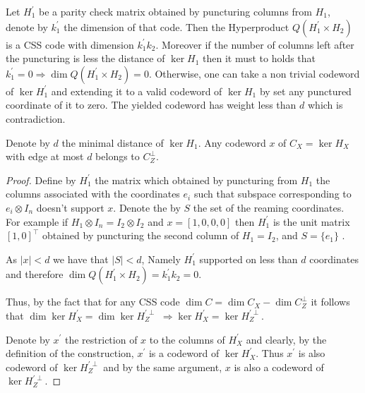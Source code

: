 \begin{remark}
  \label{remark:pun}
  Let $H_{1}^{\prime}$ be a parity check matrix obtained by puncturing columns from $H_{1}$, denote by $k^{\prime}_{1}$ the dimension of that code. Then the Hyperproduct $Q(H_{1}^{\prime}\times H_{2})$ is a CSS code with dimension $k^{\prime}_{1}k_{2}$. Moreover if the number of columns left after the puncturing is less the distance of $\ker H_{1}$ then it must to holds that $k^{\prime}_{1} = 0 \Rightarrow \dim Q(H_{1}^{\prime} \times H_{2}) = 0$. Otherwise, one can take a non trivial codeword of $\ker H^{\prime}_{1}$ and extending it to a valid codeword of $\ker H_{1}$ by set any punctured coordinate of it to zero. The yielded codeword has weight less than $d$ which is contradiction.  
\end{remark}

\begin{claim}
  \label{claim:Hdis}
  Denote by $d$ the minimal distance of $\ker H_{1}$. Any codeword $x$ of $C_{X} = \ker H_{X}$ with edge at most $d$ belongs to $C_{Z}^{\perp}$.  
\end{claim}

\begin{proof}
  Define by $H^{\prime}_{1}$ the matrix which obtained by puncturing from $H_{1}$ the columns  associated with the coordinates $e_{i}$ such that subspace corresponding to $ e_{i} \otimes I_{n} $ doesn't support $x$. Denote the by $S$ the set of the reaming coordinates.  For example if $ H_{1} \otimes I_{n} = I_{2} \otimes I_{2}$ and $x = [1,0,0,0]$ then $H^{\prime}_{1} $ is the unit matrix $[1 , 0]^\top$ obtained by puncturing the second column of $H_{1} = I_{2}$, and $S= \{ e_{1} \} $ .  

  As $|x| < d $ we have that $|S| < d$, Namely $H^{\prime}_{1}$ supported on less than $d$ coordinates and therefore $\dim Q\left( H^{\prime}_{1} \times H_{2} \right)= k^{\prime}_{1}k_{2} = 0$.

  Thus, by the fact that for any CSS code $\dim C = \dim C_{X} - \dim C_{Z}^\perp$ it follows that $\dim \ker H_{X}^{\prime}  = \dim \ker H_{Z}^{\prime \perp}$ $ \Rightarrow \ker H_{X}^{\prime}  = \ker H_{Z}^{\prime \perp}$.

  Denote by $x^{\prime}$ the restriction of $x$ to the columns of $H_{X}^{\prime}$ and clearly, by the definition of the construction,  $x^{\prime}$ is a codeword of $\ker H_{X}^{\prime}$. Thus $x^{\prime}$ is also codeword of $\ker H_{Z}^{\prime \perp}$ and by the same argument, $x$ is also a codeword of $\ker H_{Z}^{\prime \perp}$. 
\end{proof}

